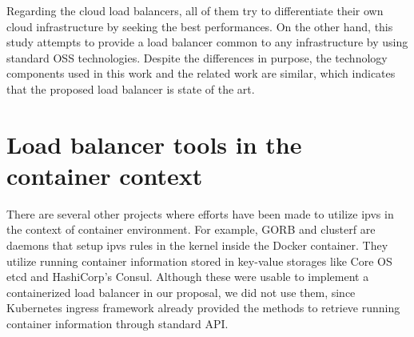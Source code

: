 \begin{table}[h]
  \centering

  \par\bigskip
  \begin{minipage}{0.9\columnwidth}
    \caption[Cloud load balancer comparison]{
    Cloud load balancer comparison.
    }   
    \label{tabl:cloud_lb}
  \end{minipage}
\end{table}

Regarding the cloud load balancers, all of them try to differentiate their own cloud infrastructure by seeking the best performances.
On the other hand, this study attempts to provide a load balancer common to any infrastructure by using standard OSS technologies.
Despite the differences in purpose, the technology components used in this work and the related work are similar, which indicates that the proposed load balancer is state of the art.

\section{Load balancer tools in the container context}

There are several other projects where efforts have been made to utilize ipvs in the context of container environment.
For example, GORB\cite{Sibiryov2015} and clusterf\cite{Aaltodoc:http://urn.fi/URN:NBN:fi:aalto-201611025433} are daemons 
that setup ipvs rules in the kernel inside the Docker container. 
They utilize running container information stored in key-value storages
like Core OS etcd\cite{CoreOSEtcd} and HashiCorp's Consul\cite{HashiCorpConsul}. 
Although these were usable to implement a containerized load balancer in our proposal, we did not use them, 
since Kubernetes ingress framework already provided the methods to retrieve running container information through standard API.

